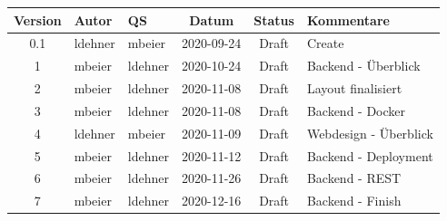 \documentclass[minted, notitle]{protocol}
\begin{document}
\begin{center}

\begin{tabular}{| c | p{1.8cm} | p{1.8cm} | c | c | p{3.4cm} |}
\hline \rowcolor{gray} \textbf{\color{white}Version} & \textbf{\color{white}Autor} & \textbf{\color{white}QS} & \textbf{\color{white}Datum} & \textbf{\color{white}Status} & \textbf{\color{white}Kommentare} \\ 
 \hline \hline
0.1 & ldehner & mbeier  & 2020-09-24 & Draft & Create \\ \hline 
1   & mbeier  & ldehner & 2020-10-24 & Draft & Backend - Überblick \\ \hline
2   & mbeier  & ldehner & 2020-11-08 & Draft & Layout finalisiert \\ \hline
3   & mbeier  & ldehner & 2020-11-08 & Draft & Backend - Docker \\ \hline
4   & ldehner  & mbeier & 2020-11-09 & Draft & Webdesign - Überblick \\ \hline
5   & mbeier  & ldehner & 2020-11-12 & Draft & Backend - Deployment \\ \hline
6   & mbeier  & ldehner & 2020-11-26 & Draft & Backend - REST \\ \hline
7   & mbeier  & ldehner  & 2020-12-16 & Draft & Backend - Finish \\ \hline

\end{tabular}
\end{center}

\clearpage
{
  \hypersetup{linkcolor=black}
  \tableofcontents
} 
\clearpage



\end{document}
